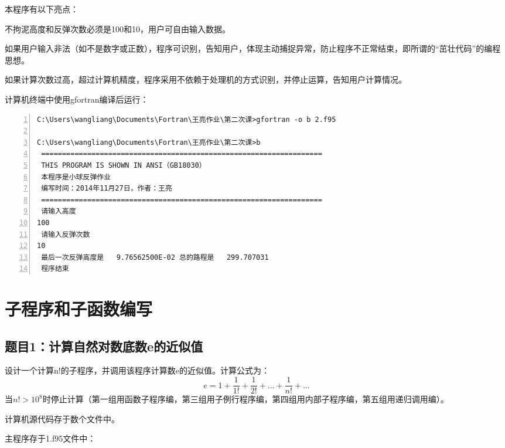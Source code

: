\documentclass[hyperref,UTF-8]{ctexart}
\begin{document}
本程序有以下亮点：
\begin{dinglist}{47}
\item 不拘泥高度和反弹次数必须是100和10，用户可自由输入数据。
\item 如果用户输入非法（如不是数字或正数），程序可识别，告知用户，体现主动捕捉异常，防止程序不正常结束，即所谓的“茁壮代码”的编程思想。
\item 如果计算次数过高，超过计算机精度，程序采用不依赖于处理机的方式识别，并停止运算，告知用户计算情况。
\end{dinglist}

计算机终端中使用gfortran编译后运行：

\begin{Verbatim}[numbers=left,fontsize=\small]
C:\Users\wangliang\Documents\Fortran\王亮作业\第二次课>gfortran -o b 2.f95

C:\Users\wangliang\Documents\Fortran\王亮作业\第二次课>b
 ===================================================================
 THIS PROGRAM IS SHOWN IN ANSI（GB18030）
 本程序是小球反弹作业
 编写时间：2014年11月27日，作者：王亮
 ===================================================================
 请输入高度
100
 请输入反弹次数
10
 最后一次反弹高度是   9.76562500E-02 总的路程是   299.707031
 程序结束
\end{Verbatim}
\section{子程序和子函数编写}
\subsection{题目1：计算自然对数底数e的近似值}
设计一个计算n!的子程序，并调用该程序计算数e的近似值。计算公式为：
$$e=1+\frac{1}{1!}+\frac{1}{2!}+\dots +\frac{1}{n!}+\dots $$
当$n!>10^8$时停止计算（第一组用函数子程序编，第三组用子例行程序编，第四组用内部子程序编，第五组用递归调用编）。

计算机源代码存于数个文件中。

主程序存于1.f95文件中：
\end{document}
